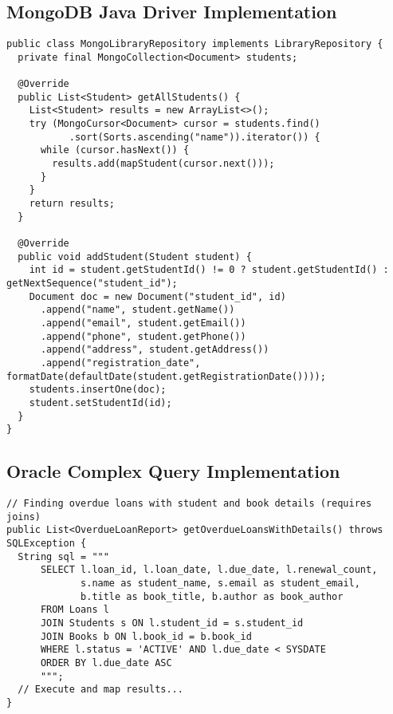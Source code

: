 \documentclass[12pt,a4paper]{article}
\begin{document}
\subsection{MongoDB Java Driver Implementation}
\begin{lstlisting}[style=java, caption=MongoDB Java Driver Implementation]
public class MongoLibraryRepository implements LibraryRepository {
  private final MongoCollection<Document> students;

  @Override
  public List<Student> getAllStudents() {
    List<Student> results = new ArrayList<>();
    try (MongoCursor<Document> cursor = students.find()
           .sort(Sorts.ascending("name")).iterator()) {
      while (cursor.hasNext()) {
        results.add(mapStudent(cursor.next()));
      }
    }
    return results;
  }

  @Override
  public void addStudent(Student student) {
    int id = student.getStudentId() != 0 ? student.getStudentId() : getNextSequence("student_id");
    Document doc = new Document("student_id", id)
      .append("name", student.getName())
      .append("email", student.getEmail())
      .append("phone", student.getPhone())
      .append("address", student.getAddress())
      .append("registration_date", formatDate(defaultDate(student.getRegistrationDate())));
    students.insertOne(doc);
    student.setStudentId(id);
  }
}
\end{lstlisting}

\subsection{Oracle Complex Query Implementation}
\begin{lstlisting}[style=java, caption=Oracle Complex Query Implementation]
// Finding overdue loans with student and book details (requires joins)
public List<OverdueLoanReport> getOverdueLoansWithDetails() throws SQLException {
  String sql = """
      SELECT l.loan_id, l.loan_date, l.due_date, l.renewal_count,
             s.name as student_name, s.email as student_email,
             b.title as book_title, b.author as book_author
      FROM Loans l
      JOIN Students s ON l.student_id = s.student_id
      JOIN Books b ON l.book_id = b.book_id
      WHERE l.status = 'ACTIVE' AND l.due_date < SYSDATE
      ORDER BY l.due_date ASC
      """;
  // Execute and map results...
}
\end{lstlisting}
\end{document}
